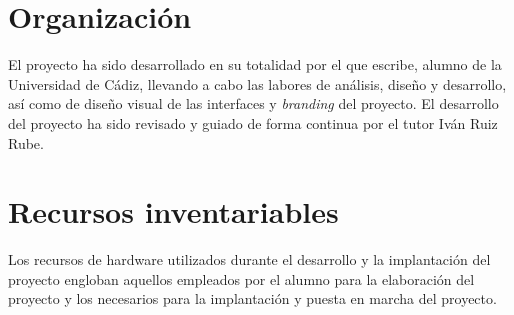 \section{Organización}

El proyecto ha sido desarrollado en su totalidad por el que escribe, alumno de
la Universidad de Cádiz, llevando a cabo las labores de análisis, diseño y
desarrollo, así como de diseño visual de las interfaces y \textit{branding} del
proyecto. El desarrollo del proyecto ha sido revisado y guiado de forma continua por el
tutor Iván Ruiz Rube.

\section{Recursos inventariables}

Los recursos de hardware utilizados durante el desarrollo y la implantación del
proyecto engloban aquellos empleados por el alumno para la elaboración del
proyecto y los necesarios para la implantación y puesta en marcha del proyecto.

